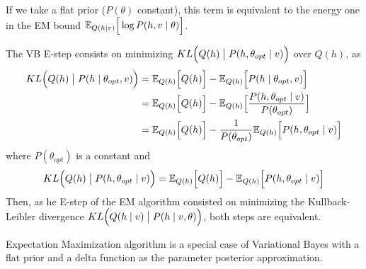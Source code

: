 If we take a flat prior (\(P(\theta) \)  constant), this term is equivalent to the energy one in the EM bound \(\mathbb{E}_{Q(h\mid v)}\Big[\log{P(h,v \mid \theta)}\Big]\).

The VB E-step consists on minimizing \(KL\Big(Q(h) \bigm| P(h,\theta_{opt} \mid v)\Big)\) over \(Q(h)\), as
\[
  \begin{aligned}
    KL\Big(Q(h) \bigm| P(h\mid \theta_{opt}, v)\Big) &= \mathbb{E}_{Q(h)}\Big[Q(h)\Big] - \mathbb{E}_{Q(h)}\Big[P(h \mid \theta_{opt}, v)\Big] \\
    &= \mathbb{E}_{Q(h)}\Big[Q(h)\Big] - \mathbb{E}_{Q(h)}\Big[\frac{P(h, \theta_{opt} \mid v)}{P(\theta_{opt})}\Big]  \\
    &= \mathbb{E}_{Q(h)}\Big[Q(h)\Big] - \frac{1}{P(\theta_{opt})}\mathbb{E}_{Q(h)}\Big[P(h, \theta_{opt} \mid v)\Big]
\end{aligned}
\]
where \(P(\theta_{opt})\) is a constant and
\[
KL\Big(Q(h) \bigm| P(h, \theta_{opt} \mid v)\Big) = \mathbb{E}_{Q(h)}\Big[Q(h)\Big] - \mathbb{E}_{Q(h)}\Big[P(h, \theta_{opt} \mid v)\Big]
\]
Then, as  he E-step of the EM algorithm consisted on minimizing the Kullback-Leibler divergence \(KL\Big(Q(h \mid v) \bigm| P(h \mid v, \theta)\Big)\), both steps are equivalent.

\begin{remark}
  Expectation Maximization algorithm is a special case of Variational Bayes with a flat prior and a delta function as the parameter posterior approximation.
\end{remark}
